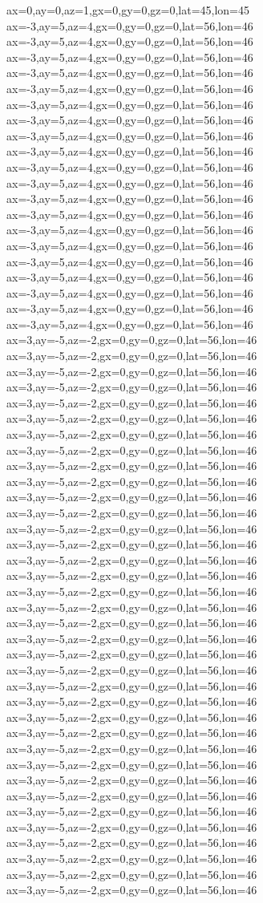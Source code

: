 ax=0,ay=0,az=1,gx=0,gy=0,gz=0,lat=45,lon=45
ax=-3,ay=5,az=4,gx=0,gy=0,gz=0,lat=56,lon=46
ax=-3,ay=5,az=4,gx=0,gy=0,gz=0,lat=56,lon=46
ax=-3,ay=5,az=4,gx=0,gy=0,gz=0,lat=56,lon=46
ax=-3,ay=5,az=4,gx=0,gy=0,gz=0,lat=56,lon=46
ax=-3,ay=5,az=4,gx=0,gy=0,gz=0,lat=56,lon=46
ax=-3,ay=5,az=4,gx=0,gy=0,gz=0,lat=56,lon=46
ax=-3,ay=5,az=4,gx=0,gy=0,gz=0,lat=56,lon=46
ax=-3,ay=5,az=4,gx=0,gy=0,gz=0,lat=56,lon=46
ax=-3,ay=5,az=4,gx=0,gy=0,gz=0,lat=56,lon=46
ax=-3,ay=5,az=4,gx=0,gy=0,gz=0,lat=56,lon=46
ax=-3,ay=5,az=4,gx=0,gy=0,gz=0,lat=56,lon=46
ax=-3,ay=5,az=4,gx=0,gy=0,gz=0,lat=56,lon=46
ax=-3,ay=5,az=4,gx=0,gy=0,gz=0,lat=56,lon=46
ax=-3,ay=5,az=4,gx=0,gy=0,gz=0,lat=56,lon=46
ax=-3,ay=5,az=4,gx=0,gy=0,gz=0,lat=56,lon=46
ax=-3,ay=5,az=4,gx=0,gy=0,gz=0,lat=56,lon=46
ax=-3,ay=5,az=4,gx=0,gy=0,gz=0,lat=56,lon=46
ax=-3,ay=5,az=4,gx=0,gy=0,gz=0,lat=56,lon=46
ax=-3,ay=5,az=4,gx=0,gy=0,gz=0,lat=56,lon=46
ax=-3,ay=5,az=4,gx=0,gy=0,gz=0,lat=56,lon=46
ax=3,ay=-5,az=-2,gx=0,gy=0,gz=0,lat=56,lon=46
ax=3,ay=-5,az=-2,gx=0,gy=0,gz=0,lat=56,lon=46
ax=3,ay=-5,az=-2,gx=0,gy=0,gz=0,lat=56,lon=46
ax=3,ay=-5,az=-2,gx=0,gy=0,gz=0,lat=56,lon=46
ax=3,ay=-5,az=-2,gx=0,gy=0,gz=0,lat=56,lon=46
ax=3,ay=-5,az=-2,gx=0,gy=0,gz=0,lat=56,lon=46
ax=3,ay=-5,az=-2,gx=0,gy=0,gz=0,lat=56,lon=46
ax=3,ay=-5,az=-2,gx=0,gy=0,gz=0,lat=56,lon=46
ax=3,ay=-5,az=-2,gx=0,gy=0,gz=0,lat=56,lon=46
ax=3,ay=-5,az=-2,gx=0,gy=0,gz=0,lat=56,lon=46
ax=3,ay=-5,az=-2,gx=0,gy=0,gz=0,lat=56,lon=46
ax=3,ay=-5,az=-2,gx=0,gy=0,gz=0,lat=56,lon=46
ax=3,ay=-5,az=-2,gx=0,gy=0,gz=0,lat=56,lon=46
ax=3,ay=-5,az=-2,gx=0,gy=0,gz=0,lat=56,lon=46
ax=3,ay=-5,az=-2,gx=0,gy=0,gz=0,lat=56,lon=46
ax=3,ay=-5,az=-2,gx=0,gy=0,gz=0,lat=56,lon=46
ax=3,ay=-5,az=-2,gx=0,gy=0,gz=0,lat=56,lon=46
ax=3,ay=-5,az=-2,gx=0,gy=0,gz=0,lat=56,lon=46
ax=3,ay=-5,az=-2,gx=0,gy=0,gz=0,lat=56,lon=46
ax=3,ay=-5,az=-2,gx=0,gy=0,gz=0,lat=56,lon=46
ax=3,ay=-5,az=-2,gx=0,gy=0,gz=0,lat=56,lon=46
ax=3,ay=-5,az=-2,gx=0,gy=0,gz=0,lat=56,lon=46
ax=3,ay=-5,az=-2,gx=0,gy=0,gz=0,lat=56,lon=46
ax=3,ay=-5,az=-2,gx=0,gy=0,gz=0,lat=56,lon=46
ax=3,ay=-5,az=-2,gx=0,gy=0,gz=0,lat=56,lon=46
ax=3,ay=-5,az=-2,gx=0,gy=0,gz=0,lat=56,lon=46
ax=3,ay=-5,az=-2,gx=0,gy=0,gz=0,lat=56,lon=46
ax=3,ay=-5,az=-2,gx=0,gy=0,gz=0,lat=56,lon=46
ax=3,ay=-5,az=-2,gx=0,gy=0,gz=0,lat=56,lon=46
ax=3,ay=-5,az=-2,gx=0,gy=0,gz=0,lat=56,lon=46
ax=3,ay=-5,az=-2,gx=0,gy=0,gz=0,lat=56,lon=46
ax=3,ay=-5,az=-2,gx=0,gy=0,gz=0,lat=56,lon=46
ax=3,ay=-5,az=-2,gx=0,gy=0,gz=0,lat=56,lon=46
ax=3,ay=-5,az=-2,gx=0,gy=0,gz=0,lat=56,lon=46
ax=3,ay=-5,az=-2,gx=0,gy=0,gz=0,lat=56,lon=46
ax=3,ay=-5,az=-2,gx=0,gy=0,gz=0,lat=56,lon=46
